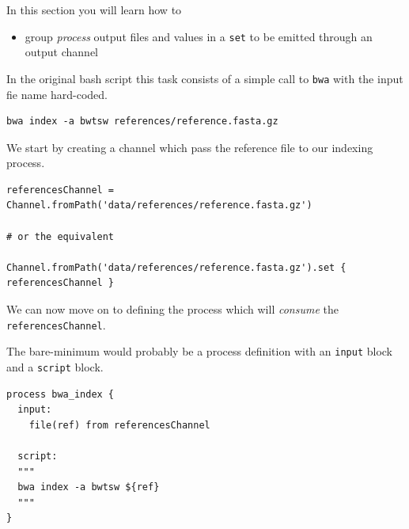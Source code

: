 In this section you will learn how to

\begin{itemize}
 \item  group \emph{process} output files and values in a \texttt{set} to be emitted through an output channel
\end{itemize}

In the original bash script this task consists of a simple call to \texttt{bwa} with 
the input fie name hard-coded. %

\begin{lstlisting}
bwa index -a bwtsw references/reference.fasta.gz
\end{lstlisting}

We start by creating a channel which pass the reference file to our indexing process. 

\begin{lstlisting}
referencesChannel = Channel.fromPath('data/references/reference.fasta.gz') 

# or the equivalent

Channel.fromPath('data/references/reference.fasta.gz').set { referencesChannel } 
\end{lstlisting}

We can now move on to defining the process which will \emph{consume} the \texttt{referencesChannel}.

The bare-minimum would probably be a process definition with 
an \texttt{input} block and a \texttt{script} block.

\begin{lstlisting}
process bwa_index {
  input:
    file(ref) from referencesChannel

  script:
  """
  bwa index -a bwtsw ${ref}
  """
}
\end{lstlisting}



%
%
%
%    

